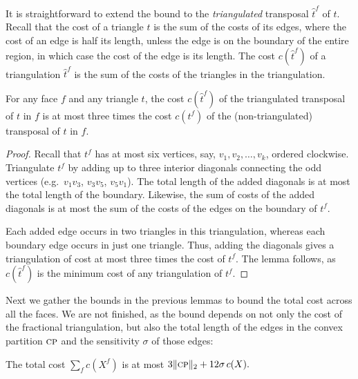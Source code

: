\documentclass[final]{siamltex}
\newcommand{\transposal}[2]{{#1}^{#2}}
\newcommand{\triangulated}[2]{{\widehat{#1}}^{#2}}
\newcommand{\cost}{c}
\newcommand{\face}{f}
\newcommand{\tri}{t}  \newcommand{\vertex}{v}
\newcommand{\fracTriang}{X}
\newcommand{\sensitivity}{\sigma}
\begin{document}
It is straightforward to extend the bound to the {\em triangulated} transposal 
$\triangulated{\tri}{\face}$ of $\tri$.
Recall that the cost of a triangle $t$ is the sum of the costs of its edges,
where the cost of an edge is half its length, unless the edge is on the boundary
of the entire region, in which case the cost of the edge is its length.
The cost $\cost(\triangulated{\tri}{\face})$
of a triangulation $\triangulated{\tri}{\face}$
is the sum of the costs of the triangles 
in the triangulation.

\begin{lemma}\label{lemma:6-gon}
  For any face $\face$ and any triangle $\tri$, 
  the cost $\cost(\triangulated{\tri}{\face})$
  of the triangulated transposal of $\tri$ in $\face$
  is at most three times the cost $\cost(\transposal{\tri}{\face})$ 
  of the (non-triangulated) transposal of $\tri$ in $\face$.
\end{lemma}

\begin{proof}
  Recall that $\transposal{\tri}{\face}$ has at most six vertices,
  say, $v_1,v_2,\ldots,v_k$, ordered clockwise.
  Triangulate $\transposal{\tri}{\face}$ by adding up to three
  interior diagonals connecting the odd vertices
  (e.g.~$v_1 v_3$, $v_3 v_5$, $v_5v_1$).
  The total length of the added diagonals
  is at most the total length of the boundary.
  Likewise, the sum of costs of the added diagonals
  is at most the sum of the costs of the edges on the boundary of $\transposal{\tri}{\face}$.

  Each added edge occurs in two triangles in this triangulation,
  whereas each boundary edge occurs in just one triangle.
  Thus, adding the diagonals gives a triangulation of cost
  at most three times the cost of $\transposal{\tri}{\face}$.
  The lemma follows, as $\cost(\triangulated{\tri}{\face})$ is the minimum cost
  of any triangulation of $\transposal{\tri}{\face}$.
\end{proof}

Next we gather the bounds in the previous lemmas 
to bound the total cost across all the faces.
We are not finished, 
as the bound depends on not only the cost of the fractional triangulation,
but also the total length of the edges in the convex partition $\text{\sc cp}$
and the sensitivity $\sensitivity$ of those edges:

\begin{lemma}\label{bound}
  The total cost $\sum_\face \cost(\fracTriang^\face)$ is at most
  \(3\|\convPart\|_2 + 12 \sensitivity\, \cost(\fracTriang).\)

\end{lemma}
\end{document}
